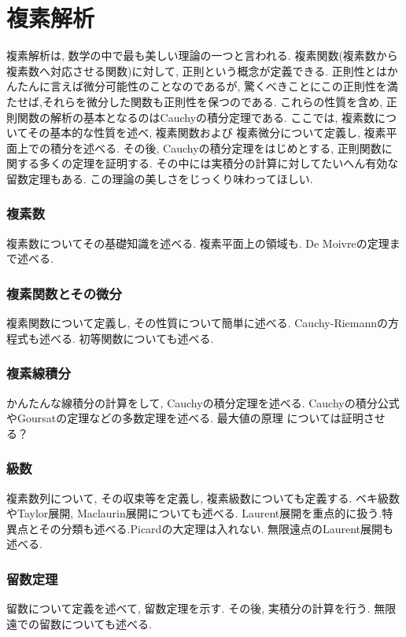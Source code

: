 \documentclass[a4j,dvipdfmx]{jsarticle}
\numberwithin{equation}{section}
\begin{document}
    \part{複素解析}
    \begin{screen}
        複素解析は, 数学の中で最も美しい理論の一つと言われる. 複素関数(複素数から複素数へ対応させる関数)に対して, 正則という概念が定義できる.
        正則性とはかんたんに言えば微分可能性のことなのであるが, 驚くべきことにこの正則性を満たせば,それらを微分した関数も正則性を保つのである. 
        これらの性質を含め, 正則関数の解析の基本となるのはCauchyの積分定理である. ここでは, 複素数についてその基本的な性質を述べ, 複素関数および
        複素微分について定義し, 複素平面上での積分を述べる. その後, Cauchyの積分定理をはじめとする, 正則関数に関する多くの定理を証明する.
        その中には実積分の計算に対してたいへん有効な留数定理もある. この理論の美しさをじっくり味わってほしい.
    \end{screen}
    \clearpage
    \section{複素数}
        複素数についてその基礎知識を述べる. 複素平面上の領域も. De Moivreの定理まで述べる.
    \clearpage
    \section{複素関数とその微分}
        複素関数について定義し, その性質について簡単に述べる. Cauchy-Riemannの方程式も述べる. 初等関数についても述べる.
    \clearpage
    \section{複素線積分}
        かんたんな線積分の計算をして, Cauchyの積分定理を述べる. Cauchyの積分公式やGoursatの定理などの多数定理を述べる. 最大値の原理
        については証明させる？
    \clearpage
    \section{級数}
        複素数列について, その収束等を定義し, 複素級数についても定義する. ベキ級数やTaylor展開, Maclaurin展開についても述べる.
        Laurent展開を重点的に扱う.特異点とその分類も述べる.Picardの大定理は入れない. 無限遠点のLaurent展開も述べる.
    \clearpage
    \section{留数定理}
        留数について定義を述べて, 留数定理を示す. その後, 実積分の計算を行う. 無限遠での留数についても述べる.
    \clearpage
\end{document}
